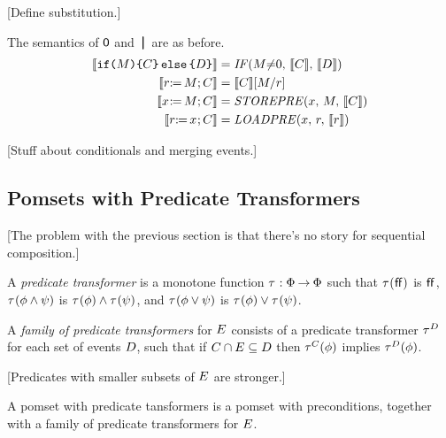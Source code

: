 [Define substitution.]

The semantics of $\NIL$ and $\PAR$ are as before.
\begin{align*}
  \sem{\IF{\aExp}\THEN\aCmd\ELSE\bCmd\FI} &= \sIF{\aExp{\neq}0}\sTHEN\sem{\aCmd}\sELSE\sem{\bCmd}\sFI
  \\
  \sem{\LET{\aReg}{\aExp}\SEMI \aCmd} &= \sem{\aCmd}[\aExp/\aReg]
  \\
  \sem{\PW{\aLoc}{\aExp}\SEMI \aCmd} &= \sSTOREPRE{\aLoc}{\aExp}{\sem{\aCmd}}
  \\
  \sem{\PR{\aLoc}{\aReg}\SEMI \aCmd} &= \sLOADPRE{\aLoc}{\aReg}{\sem{\aReg}}
\end{align*}

[Stuff about conditionals and merging events.]


\subsection{Pomsets with Predicate Transformers}



[The problem with the previous section is that there's no story for
sequential composition.]

\begin{definition}
  A \emph{predicate transformer} is a monotone function
  $\aTr:\Formulae\fun\Formulae$ such that
  $\aTr(\FALSE)$ is $\FALSE$,
  $\aTr(\aForm\land\bForm)$ is $\aTr(\aForm)\land\aTr(\bForm)$, and
  $\aTr(\aForm\lor\bForm)$ is $\aTr(\aForm)\lor\aTr(\bForm)$.
\end{definition}

\begin{definition}
  A \emph{family of predicate transformers}
  for $\aEvs$
  consists of a predicate transformer
  $\aTr[\bEvs]$ for each set of events $\bEvs$,
  such that if $\cEvs \cap \aEvs \subseteq \bEvs$
  then $\aTr[\cEvs](\aForm)$ implies $\aTr[\bEvs](\aForm)$.
\end{definition}

[Predicates with smaller subsets of $\aEvs$ are stronger.]

\begin{definition}
  A pomset with predicate tansformers is a pomset with preconditions,
  together with a family of predicate transformers for $\aEvs$.
\end{definition}

